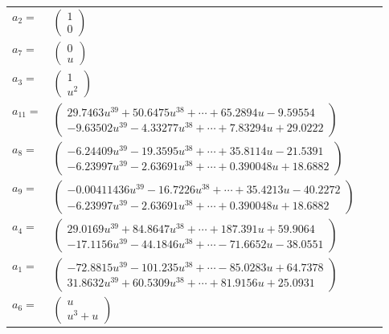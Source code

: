 \documentclass[1p]{elsarticle_modified}
\theoremstyle{definition}
\begin{document}
\begin{tabular}{m{7pt} m{180pt} m{7pt} m{180pt} }
\flushright $a_{2}=$&$\begin{pmatrix}1\\0\end{pmatrix}$ \\
\flushright $a_{7}=$&$\begin{pmatrix}0\\u\end{pmatrix}$ \\
\flushright $a_{3}=$&$\begin{pmatrix}1\\u^2\end{pmatrix}$ \\
\flushright $a_{11}=$&$\begin{pmatrix}29.7463 u^{39}+50.6475 u^{38}+\cdots+65.2894 u-9.59554\\-9.63502 u^{39}-4.33277 u^{38}+\cdots+7.83294 u+29.0222\end{pmatrix}$ \\
\flushright $a_{8}=$&$\begin{pmatrix}-6.24409 u^{39}-19.3595 u^{38}+\cdots+35.8114 u-21.5391\\-6.23997 u^{39}-2.63691 u^{38}+\cdots+0.390048 u+18.6882\end{pmatrix}$ \\
\flushright $a_{9}=$&$\begin{pmatrix}-0.00411436 u^{39}-16.7226 u^{38}+\cdots+35.4213 u-40.2272\\-6.23997 u^{39}-2.63691 u^{38}+\cdots+0.390048 u+18.6882\end{pmatrix}$ \\
\flushright $a_{4}=$&$\begin{pmatrix}29.0169 u^{39}+84.8647 u^{38}+\cdots+187.391 u+59.9064\\-17.1156 u^{39}-44.1846 u^{38}+\cdots-71.6652 u-38.0551\end{pmatrix}$ \\
\flushright $a_{1}=$&$\begin{pmatrix}-72.8815 u^{39}-101.235 u^{38}+\cdots-85.0283 u+64.7378\\31.8632 u^{39}+60.5309 u^{38}+\cdots+81.9156 u+25.0931\end{pmatrix}$ \\
\flushright $a_{6}=$&$\begin{pmatrix}u\\u^3+u\end{pmatrix}$ \\

\end{tabular}
\end{document}
